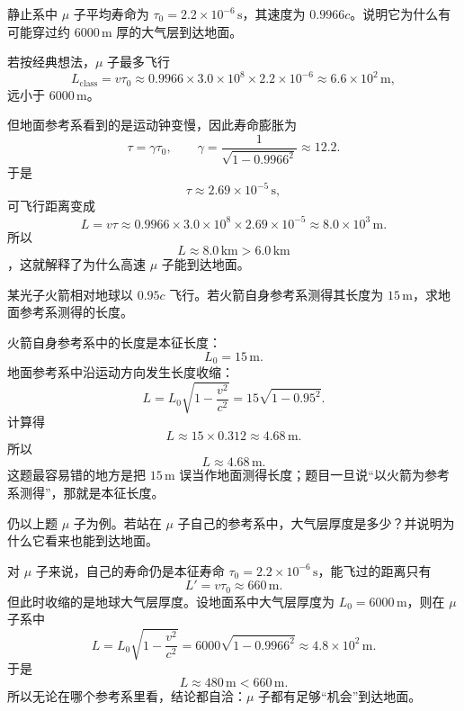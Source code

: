 \documentclass[lang=cn,11pt]{elegantbook}
\begin{document}
\begin{example}[为何 \(\mu\) 子能穿透大气层]
静止系中 \(\mu\) 子平均寿命为 \(\tau_0=2.2\times 10^{-6}\,\mathrm{s}\)，其速度为 \(0.9966c\)。说明它为什么有可能穿过约 \(6000\,\mathrm{m}\) 厚的大气层到达地面。
\end{example}

\begin{solution}
若按经典想法，\(\mu\) 子最多飞行
\[
L_{\mathrm{class}}=v\tau_0
\approx 0.9966\times 3.0\times 10^8\times 2.2\times 10^{-6}
\approx 6.6\times 10^2\,\mathrm{m},
\]
远小于 \(6000\,\mathrm{m}\)。

但地面参考系看到的是运动钟变慢，因此寿命膨胀为
\[
\tau=\gamma\tau_0,
\qquad
\gamma=\frac{1}{\sqrt{1-0.9966^2}}\approx 12.2.
\]
于是
\[
\tau\approx 2.69\times 10^{-5}\,\mathrm{s},
\]
可飞行距离变成
\[
L=v\tau\approx 0.9966\times 3.0\times 10^8\times 2.69\times 10^{-5}
\approx 8.0\times 10^3\,\mathrm{m}.
\]
所以
\[
\boxed{L\approx 8.0\,\mathrm{km}>6.0\,\mathrm{km}}
\]
，这就解释了为什么高速 \(\mu\) 子能到达地面。
\end{solution}

\begin{example}[火箭在地面参考系中的长度]
某光子火箭相对地球以 \(0.95c\) 飞行。若火箭自身参考系测得其长度为 \(15\,\mathrm{m}\)，求地面参考系测得的长度。
\end{example}

\begin{solution}
火箭自身参考系中的长度是本征长度：
\[
L_0=15\,\mathrm{m}.
\]
地面参考系中沿运动方向发生长度收缩：
\[
L=L_0\sqrt{1-\frac{v^2}{c^2}}
=15\sqrt{1-0.95^2}.
\]
计算得
\[
L\approx 15\times 0.312
\approx 4.68\,\mathrm{m}.
\]
所以
\[
\boxed{L\approx 4.68\,\mathrm{m}.}
\]
这题最容易错的地方是把 \(15\,\mathrm{m}\) 误当作地面测得长度；题目一旦说“以火箭为参考系测得”，那就是本征长度。
\end{solution}

\begin{example}[\(\mu\) 子自己眼中的大气层有多厚]
仍以上题 \(\mu\) 子为例。若站在 \(\mu\) 子自己的参考系中，大气层厚度是多少？并说明为什么它看来也能到达地面。
\end{example}

\begin{solution}
对 \(\mu\) 子来说，自己的寿命仍是本征寿命 \(\tau_0=2.2\times 10^{-6}\,\mathrm{s}\)，能飞过的距离只有
\[
L'=v\tau_0\approx 660\,\mathrm{m}.
\]
但此时收缩的是地球大气层厚度。设地面系中大气层厚度为 \(L_0=6000\,\mathrm{m}\)，则在 \(\mu\) 子系中
\[
L=L_0\sqrt{1-\frac{v^2}{c^2}}
=6000\sqrt{1-0.9966^2}
\approx 4.8\times 10^2\,\mathrm{m}.
\]
于是
\[
\boxed{L\approx 480\,\mathrm{m}<660\,\mathrm{m}}.
\]
所以无论在哪个参考系里看，结论都自洽：\(\mu\) 子都有足够“机会”到达地面。
\end{solution}
\end{document}
